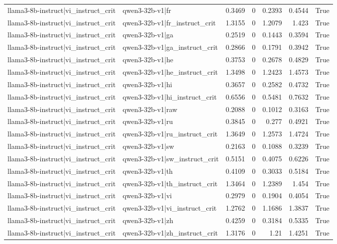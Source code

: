 \begin{table}
\begin{tabular}{l l r r r r l}
llama3-8b-instruct|vi_instruct_crit & qwen3-32b-v1|fr & 0.3469 & 0 & 0.2393 & 0.4544 & True \\
llama3-8b-instruct|vi_instruct_crit & qwen3-32b-v1|fr_instruct_crit & 1.3155 & 0 & 1.2079 & 1.423 & True \\
llama3-8b-instruct|vi_instruct_crit & qwen3-32b-v1|ga & 0.2519 & 0 & 0.1443 & 0.3594 & True \\
llama3-8b-instruct|vi_instruct_crit & qwen3-32b-v1|ga_instruct_crit & 0.2866 & 0 & 0.1791 & 0.3942 & True \\
llama3-8b-instruct|vi_instruct_crit & qwen3-32b-v1|he & 0.3753 & 0 & 0.2678 & 0.4829 & True \\
llama3-8b-instruct|vi_instruct_crit & qwen3-32b-v1|he_instruct_crit & 1.3498 & 0 & 1.2423 & 1.4573 & True \\
llama3-8b-instruct|vi_instruct_crit & qwen3-32b-v1|hi & 0.3657 & 0 & 0.2582 & 0.4732 & True \\
llama3-8b-instruct|vi_instruct_crit & qwen3-32b-v1|hi_instruct_crit & 0.6556 & 0 & 0.5481 & 0.7632 & True \\
llama3-8b-instruct|vi_instruct_crit & qwen3-32b-v1|raw & 0.2088 & 0 & 0.1012 & 0.3163 & True \\
llama3-8b-instruct|vi_instruct_crit & qwen3-32b-v1|ru & 0.3845 & 0 & 0.277 & 0.4921 & True \\
llama3-8b-instruct|vi_instruct_crit & qwen3-32b-v1|ru_instruct_crit & 1.3649 & 0 & 1.2573 & 1.4724 & True \\
llama3-8b-instruct|vi_instruct_crit & qwen3-32b-v1|sw & 0.2163 & 0 & 0.1088 & 0.3239 & True \\
llama3-8b-instruct|vi_instruct_crit & qwen3-32b-v1|sw_instruct_crit & 0.5151 & 0 & 0.4075 & 0.6226 & True \\
llama3-8b-instruct|vi_instruct_crit & qwen3-32b-v1|th & 0.4109 & 0 & 0.3033 & 0.5184 & True \\
llama3-8b-instruct|vi_instruct_crit & qwen3-32b-v1|th_instruct_crit & 1.3464 & 0 & 1.2389 & 1.454 & True \\
llama3-8b-instruct|vi_instruct_crit & qwen3-32b-v1|vi & 0.2979 & 0 & 0.1904 & 0.4054 & True \\
llama3-8b-instruct|vi_instruct_crit & qwen3-32b-v1|vi_instruct_crit & 1.2762 & 0 & 1.1686 & 1.3837 & True \\
llama3-8b-instruct|vi_instruct_crit & qwen3-32b-v1|zh & 0.4259 & 0 & 0.3184 & 0.5335 & True \\
llama3-8b-instruct|vi_instruct_crit & qwen3-32b-v1|zh_instruct_crit & 1.3176 & 0 & 1.21 & 1.4251 & True \\

\end{tabular}
\end{table}
